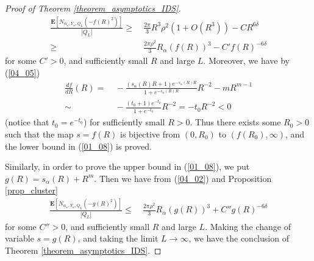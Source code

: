 \documentclass[12pt,a4paper]{article}
\begin{document}
\begin{proof}[Proof of Theorem \ref{theorem_asymptotics_IDS}]
\begin{align*}
 \frac{\mathbf{E}[N_{\alpha_\omega,Y_\omega,Q_L}(-f(R)^2)]}{|Q_L|}
\geq&\ 
\frac{2\pi}{3}R^3\rho^2(1+O(R^3))
- C R^{6\delta}\\
\geq &\ 
\frac{2\pi\rho^2}{3}R_\alpha(f(R))^3 - C' f(R)^{-6\delta}
\end{align*}
for some $C'>0$,
 and sufficiently small $R$ and large $L$.
Moreover,
we have by (\ref{04_05})
\begin{align*}
\frac{df}{dR}(R)
=&\ 
-
\frac{(s_\alpha(R)R+1)e^{-s_\alpha(R)R}}{ 1+e^{-s_\alpha(R)R}}R^{-2}
 - mR^{m-1}\\
\sim&\ 
-\frac{(t_0+1)e^{-t_0}}{ 1+e^{-t_0}}R^{-2}
=-t_0 R^{-2}
<0
\end{align*}
(notice that $t_0=e^{-t_0}$) for sufficiently small $R>0$.
Thus 
there exists some $R_0>0$ such that
the map $s=f(R)$ is 
bijective from $(0,R_0)$ to $(f(R_0),\infty)$,
and the lower bound in (\ref{01_08}) is proved.


Similarly, in order to prove the upper bound in (\ref{01_08}),
we put $g(R)=s_\alpha(R)+R^m$.
Then we have from (\ref{04_02}) and Proposition \ref{prop_cluster}
\begin{align*}
\frac{\mathbf{E}[N_{\alpha_\omega,Y_\omega,Q_L}(-g(R)^2)]}{|Q_L|}
\leq &\ 
\frac{2\pi\rho^2}{3}R_\alpha(g(R))^3 + C'' g(R)^{-6\delta}
\end{align*}
for some $C''>0$,
 and sufficiently small $R$ and large $L$.
Making the change of variable $s=g(R)$,
and taking the limit $L\to \infty$,
we have the conclusion of Theorem \ref{theorem_asymptotics_IDS}.
\end{proof}
\end{document}
